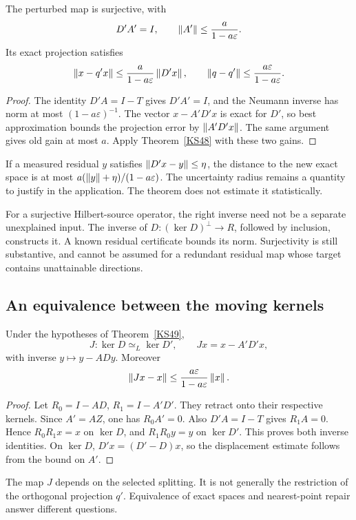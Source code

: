 \begin{theorem}\label{KS49}
The perturbed map is surjective, with
\[
 D'A'=I,\qquad \left\lVert A'\right\rVert\le\frac{a}{1-a\varepsilon}.
\]
Its exact projection satisfies
\[
 \left\lVert x-q'x\right\rVert\le\frac{a}{1-a\varepsilon}\left\lVert D'x\right\rVert,\qquad
 \left\lVert q-q'\right\rVert\le\frac{a\varepsilon}{1-a\varepsilon}.
\]
\end{theorem}
\begin{proof}
The identity \(D'A=I-T\) gives \(D'A'=I\), and the Neumann inverse has norm at most \((1-a\varepsilon)^{-1}\). The vector \(x-A'D'x\) is exact for \(D'\), so best approximation bounds the projection error by \(\left\lVert A'D'x\right\rVert\). The same argument gives old gain at most \(a\). Apply Theorem~\ref{KS48} with these two gains.
\end{proof}
If a measured residual \(y\) satisfies \(\left\lVert D'x-y\right\rVert\le\eta\), the distance to the new exact space is at most \(a(\left\lVert y\right\rVert+\eta)/(1-a\varepsilon)\). The uncertainty radius remains a quantity to justify in the application. The theorem does not estimate it statistically.

For a surjective Hilbert-source operator, the right inverse need not be a separate unexplained input. The inverse of \(D:(\ker D)^\perp\to R\), followed by inclusion, constructs it. A known residual certificate bounds its norm. Surjectivity is still substantive, and cannot be assumed for a redundant residual map whose target contains unattainable directions.

\subsection{An equivalence between the moving kernels}
\begin{theorem}\label{KS50}
Under the hypotheses of Theorem~\ref{KS49},
\[
 J:\ker D\simeq_L\ker D',\qquad Jx=x-A'D'x,
\]
with inverse \(y\mapsto y-ADy\). Moreover
\[
 \left\lVert Jx-x\right\rVert\le\frac{a\varepsilon}{1-a\varepsilon}\left\lVert x\right\rVert.
\]
\end{theorem}
\begin{proof}
Let \(R_0=I-AD\), \(R_1=I-A'D'\). They retract onto their respective kernels. Since \(A'=AZ\), one has \(R_0A'=0\). Also \(D'A=I-T\) gives \(R_1A=0\). Hence \(R_0R_1x=x\) on \(\ker D\), and \(R_1R_0y=y\) on \(\ker D'\). This proves both inverse identities. On \(\ker D\), \(D'x=(D'-D)x\), so the displacement estimate follows from the bound on \(A'\).
\end{proof}
The map \(J\) depends on the selected splitting. It is not generally the restriction of the orthogonal projection \(q'\). Equivalence of exact spaces and nearest-point repair answer different questions.


